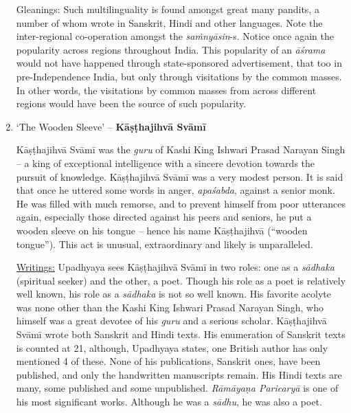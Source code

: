 \begin{enumerate}
 Gleanings: Such multilinguality is found amongst great many pandits, a number of whom wrote in Sanskrit, Hindi and other languages. Note the inter-regional co-operation amongst the \textit{saṁnyāsin}-s. Notice once again the popularity across regions throughout India. This popularity of an \textit{āśrama} would not have happened through state-sponsored advertisement, that too in pre-Independence India, but only through visitations by the common masses. In other words, the visitations by common masses from across different regions would have been the source of such popularity.

\newpage

 \item 
 ‘The Wooden Sleeve’ – \textbf{Kāṣṭhajihvā Svāmī}

 Kāṣṭhajihvā Svāmī was the \textit{guru} of Kashi King Ishwari Prasad Narayan Singh – a king of exceptional intelligence with a sincere devotion towards the pursuit of knowledge. Kāṣṭhajihvā Svāmī was a very modest person. It is said that once he uttered some words in anger, \textit{apaśabda}, against a senior monk. He was filled with much remorse, and to prevent himself from poor utterances again, especially those directed against his peers and seniors, he put a wooden sleeve on his tongue – hence his name Kāṣṭhajihvā (“wooden tongue”). This act is unusual, extraordinary and likely is unparalleled.

\vspace{0.1cm}

 \underline{Writings:} Upadhyaya sees Kāṣṭhajihvā Svāmī in two roles: one as a \textit{sādhaka} (spiritual seeker) and the other, a poet. Though his role as a poet is relatively well known, his role as a \textit{sādhaka} is not so well known. His favorite acolyte was none other than the Kashi King Ishwari Prasad Narayan Singh, who himself was a great devotee of his \textit{guru} and a serious scholar. Kāṣṭhajihvā Svāmī wrote both Sanskrit and Hindi texts. His enumeration of Sanskrit texts is counted at 21, although, Upadhyaya states, one British author has only mentioned 4 of these. None of his publications, Sanskrit ones, have been published, and only the handwritten manuscripts remain. His Hindi texts are many, some published and some unpublished. \textit{Rāmāyaṇa Paricaryā} is one of his most significant works. Although he was a \textit{sādhu}, he was also a poet.


\end{enumerate}
